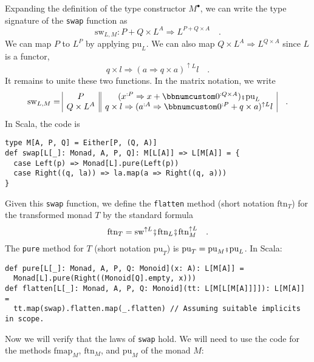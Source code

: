 Expanding the definition of the type constructor $M^{\bullet}$, we
can write the type signature of the \lstinline!swap!
function as 
\[
\text{sw}_{L,M}:P+Q\times L^{A}\Rightarrow L^{P+Q\times A}\quad.
\]
We can map $P$ to $L^{P}$ by applying $\text{pu}_{L}$. We can also
map $Q\times L^{A}\Rightarrow L^{Q\times A}$ since $L$ is a functor,
\[
q\times l\Rightarrow\left(a\Rightarrow q\times a\right)^{\uparrow L}l\quad.
\]
 It remains to unite these two functions. In the matrix notation,
we write
\begin{equation}
\text{sw}_{L,M}=\begin{array}{|c||c|}
P & (x^{:P}\Rightarrow x+\bbnum 0^{:Q\times A})\bef\text{pu}_{L}\\
Q\times L^{A} & q\times l\Rightarrow(a^{:A}\Rightarrow\bbnum 0^{:P}+q\times a)^{\uparrow L}l
\end{array}\quad.\label{eq:single-valued-monad-def-of-swap}
\end{equation}
In Scala, the code is
\begin{lstlisting}
type M[A, P, Q] = Either[P, (Q, A)]
def swap[L[_]: Monad, A, P, Q]: M[L[A]] => L[M[A]] = {
  case Left(p) => Monad[L].pure(Left(p))
  case Right((q, la)) => la.map(a => Right((q, a)))
}
\end{lstlisting}
Given this \lstinline!swap!
function, we define the \lstinline!flatten!
method (short notation $\text{ftn}_{T}$) for the transformed monad
$T$ by the standard formula
\[
\text{ftn}_{T}=\text{sw}^{\uparrow L}\bef\text{ftn}_{L}\bef\text{ftn}_{M}^{\uparrow L}\quad.
\]
The \lstinline!pure! method
for $T$ (short notation $\text{pu}_{T}$) is $\text{pu}_{T}=\text{pu}_{M}\bef\text{pu}_{L}$.
In Scala:
\begin{lstlisting}
def pure[L[_]: Monad, A, P, Q: Monoid](x: A): L[M[A]] =
  Monad[L].pure(Right((Monoid[Q].empty, x)))
def flatten[L[_]: Monad, A, P, Q: Monoid](tt: L[M[L[M[A]]]]): L[M[A]] =
  tt.map(swap).flatten.map(_.flatten) // Assuming suitable implicits in scope.
\end{lstlisting}
Now we will verify that the laws of \lstinline!swap!
hold. We will need to use the code for the methods $\text{fmap}_{M}$,
$\text{ftn}_{M}$, and $\text{pu}_{M}$ of the monad $M$:
